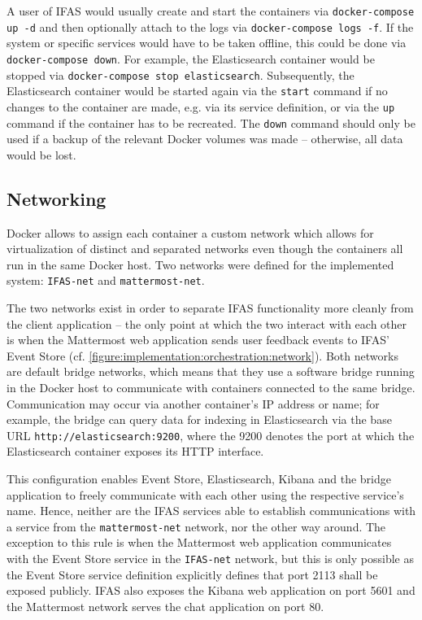 A user of \ac{IFAS} would usually create and start the containers via \texttt{docker-compose up -d} and then optionally attach to the logs via \texttt{docker-compose logs -f}.
If the system or specific services would have to be taken offline, this could be done via \texttt{docker-compose down}.
For example, the Elasticsearch container would be stopped via \texttt{docker-compose stop elasticsearch}.
Subsequently, the Elasticsearch container would be started again via the \texttt{start} command if no changes to the container are made, e.g. via its service definition, or via the \texttt{up} command if the container has to be recreated.
The \texttt{down} command should only be used if a backup of the relevant Docker volumes was made -- otherwise, all data would be lost.

\subsection{Networking}

Docker allows to assign each container a custom network which allows for virtualization of distinct and separated networks even though the containers all run in the same Docker host.
Two networks were defined for the implemented system: \texttt{IFAS-net} and \texttt{mattermost-net}.

The two networks exist in order to separate \ac{IFAS} functionality more cleanly from the client application -- the only point at which the two interact with each other is when the Mattermost web application sends user feedback events to \ac{IFAS}' Event Store (cf. \cref{figure:implementation:orchestration:network}).
Both networks are default bridge networks, which means that they use a software bridge running in the Docker host to communicate with containers connected to the same bridge.
Communication may occur via another container's IP address or name; for example, the bridge can query data for indexing in Elasticsearch via the base URL \texttt{http://elasticsearch:9200}, where the 9200 denotes the port at which the Elasticsearch container exposes its \ac{HTTP} interface.

This configuration enables Event Store, Elasticsearch, Kibana and the bridge application to freely communicate with each other using the respective service's name.
Hence, neither are the \ac{IFAS} services able to establish communications with a service from the \texttt{mattermost-net} network, nor the other way around.
The exception to this rule is when the Mattermost web application communicates with the Event Store service in the \texttt{IFAS-net} network, but this is only possible as the Event Store service definition explicitly defines that port 2113 shall be exposed publicly.
\ac{IFAS} also exposes the Kibana web application on port 5601 and the Mattermost network serves the chat application on port 80.

